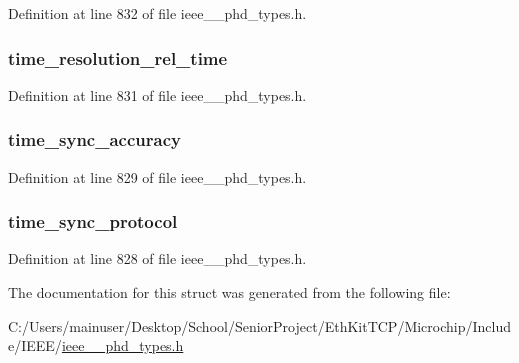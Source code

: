 Definition at line 832 of file ieee\+\_\+\_\+phd\+\_\+types.\+h.

\hypertarget{struct___mds_time_info_a3d0c4dbf0c9a992635f0f6063fb13432}{}
\subsubsection[{time\+\_\+resolution\+\_\+rel\+\_\+time}]{ time\+\_\+resolution\+\_\+rel\+\_\+time}\label{struct___mds_time_info_a3d0c4dbf0c9a992635f0f6063fb13432}


Definition at line 831 of file ieee\+\_\+\_\+phd\+\_\+types.\+h.

\hypertarget{struct___mds_time_info_ab72ebe91e37480fc6b3b053c7eee81fb}{}
\subsubsection[{time\+\_\+sync\+\_\+accuracy}]{ time\+\_\+sync\+\_\+accuracy}\label{struct___mds_time_info_ab72ebe91e37480fc6b3b053c7eee81fb}


Definition at line 829 of file ieee\+\_\+\_\+phd\+\_\+types.\+h.

\hypertarget{struct___mds_time_info_ab5af682973f964b188cbc3d862896700}{}
\subsubsection[{time\+\_\+sync\+\_\+protocol}]{ time\+\_\+sync\+\_\+protocol}\label{struct___mds_time_info_ab5af682973f964b188cbc3d862896700}


Definition at line 828 of file ieee\+\_\+\_\+phd\+\_\+types.\+h.



The documentation for this struct was generated from the following file\+:\begin{DoxyCompactItemize}
\item 
C\+:/\+Users/mainuser/\+Desktop/\+School/\+Senior\+Project/\+Eth\+Kit\+T\+C\+P/\+Microchip/\+Include/\+I\+E\+E\+E/\hyperlink{ieee__11073__phd__types_8h}{ieee\+\_\+\_\+phd\+\_\+types.\+h}\end{DoxyCompactItemize}
